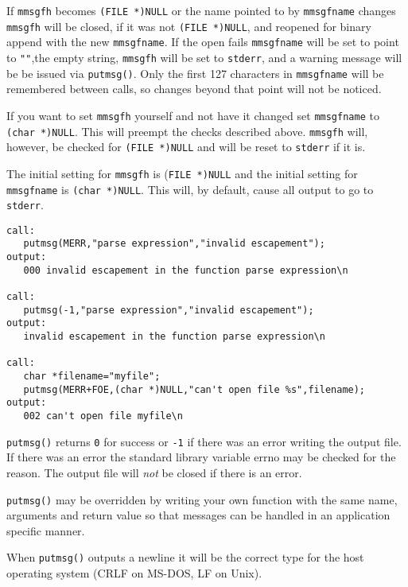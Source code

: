 If \verb`mmsgfh` becomes \verb`(FILE *)NULL` or the name pointed to by \verb`mmsgfname`
changes \verb`mmsgfh` will be closed, if it was not \verb`(FILE *)NULL`, and
reopened for binary append with the new \verb`mmsgfname`.  If the open
fails \verb`mmsgfname` will be set to point to \verb`""`,the empty string,
\verb`mmsgfh` will be set to \verb`stderr`, and a warning message will be be
issued via \verb`putmsg()`.  Only the first 127 characters in \verb`mmsgfname`
will be remembered between calls, so changes beyond that point
will not be noticed.

If you want to set \verb`mmsgfh` yourself and not have it changed set
\verb`mmsgfname` to \verb`(char *)NULL`.  This will preempt the checks
described above. \verb`mmsgfh` will, however, be checked for \verb`(FILE *)NULL`
and will be reset to \verb`stderr` if it is.

The initial setting for \verb`mmsgfh` is (\verb`FILE *)NULL` and the initial
setting for \verb`mmsgfname` is \verb`(char *)NULL`.  This will, by default,
cause all output to go to \verb`stderr`.

\EXAMPLE
\begin{verbatim}
call:
   putmsg(MERR,"parse expression","invalid escapement");
output:
   000 invalid escapement in the function parse expression\n

call:
   putmsg(-1,"parse expression","invalid escapement");
output:
   invalid escapement in the function parse expression\n

call:
   char *filename="myfile";
   putmsg(MERR+FOE,(char *)NULL,"can't open file %s",filename);
output:
   002 can't open file myfile\n

\end{verbatim}


\DIAGNOSTICS

\verb`putmsg()` returns \verb`0` for success or \verb`-1` if there was an error writing
the output file.  If there was an error the standard library
variable errno may be checked for the reason.  The output file
will {\em not} be closed if there is an error.

\NOTES

\verb`putmsg()` may be overridden by writing your own function with the
same name, arguments and return value so that messages can be
handled in an application specific manner.

When \verb`putmsg()` outputs a newline it will be the correct type for
the host operating system (CRLF on MS-DOS, LF on Unix).


